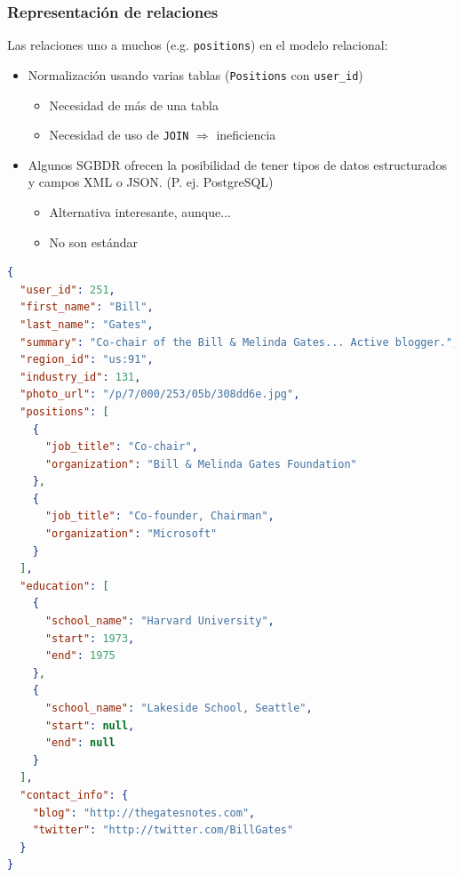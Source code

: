 \documentclass[14pt]{beamer}
\begin{document}
\begin{frame}
  \frametitle{Representación de relaciones}

  Las relaciones uno a muchos (e.g. {\tt positions}) en el modelo
  relacional:

\begin{itemize}
\item Normalización usando varias tablas ({\tt Positions} con
  {\tt user\_id})
  \begin{itemize}
  \item Necesidad de más de una tabla
  \item Necesidad de uso de {\tt JOIN} $\Rightarrow$ ineficiencia
  \end{itemize}
\item Algunos SGBDR ofrecen la posibilidad de tener tipos de datos
  estructurados y campos XML o JSON. (P. ej. PostgreSQL)
  \begin{itemize}
  \item Alternativa interesante, aunque...
  \item No son estándar
  \end{itemize}
\end{itemize}
\end{frame}

\begin{frame}
\begin{lstlisting}[language=json,basicstyle=\tiny\tt]
{
  "user_id": 251,
  "first_name": "Bill",
  "last_name": "Gates",
  "summary": "Co-chair of the Bill & Melinda Gates... Active blogger.",
  "region_id": "us:91",
  "industry_id": 131,
  "photo_url": "/p/7/000/253/05b/308dd6e.jpg",
  "positions": [
    {
      "job_title": "Co-chair",
      "organization": "Bill & Melinda Gates Foundation"
    },
    {
      "job_title": "Co-founder, Chairman",
      "organization": "Microsoft"
    }
  ],
  "education": [
    {
      "school_name": "Harvard University",
      "start": 1973,
      "end": 1975
    },
    {
      "school_name": "Lakeside School, Seattle",
      "start": null,
      "end": null
    }
  ],
  "contact_info": {
    "blog": "http://thegatesnotes.com",
    "twitter": "http://twitter.com/BillGates"
  }
}
\end{lstlisting}
\end{frame}

\end{document}
